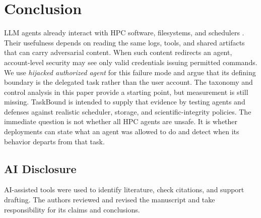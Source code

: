 \section{Conclusion}
\label{sec:conclusion}

LLM agents already interact with HPC software, filesystems, and schedulers \cite{Ma2025HPCAgent,Rosendo2025ORNL,Mondesire2025PEARC,AaltoSciComp2026}. Their usefulness depends on reading the same logs, tools, and shared artifacts that can carry adversarial content. When such content redirects an agent, account-level security may see only valid credentials issuing permitted commands. We use \emph{hijacked authorized agent} for this failure mode and argue that its defining boundary is the delegated task rather than the user account. The taxonomy and control analysis in this paper provide a starting point, but measurement is still missing. TaskBound is intended to supply that evidence by testing agents and defenses against realistic scheduler, storage, and scientific-integrity policies. The immediate question is not whether all HPC agents are unsafe. It is whether deployments can state what an agent was allowed to do and detect when its behavior departs from that task.

\subsection*{AI Disclosure}
AI-assisted tools were used to identify literature, check citations, and support drafting. The authors reviewed and revised the manuscript and take responsibility for its claims and conclusions.

